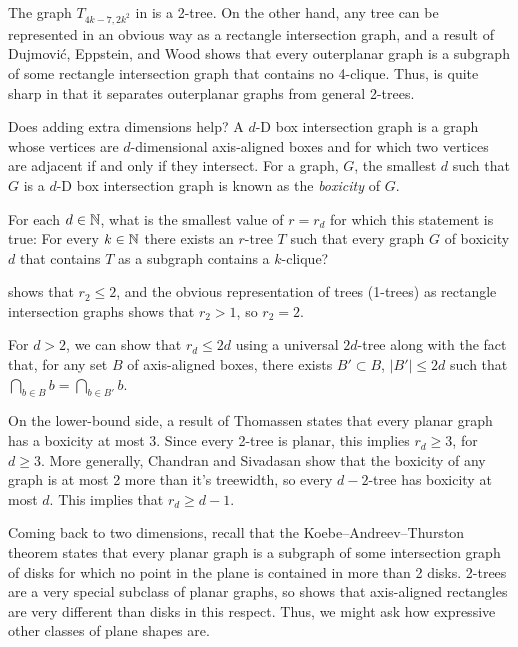 \documentclass[lotsofwhite]{patmorin}
\begin{document}
The graph $T_{4k-7,2k^2}$ in  is a 2-tree.
On the other hand, any tree can be represented in an obvious way as a
rectangle intersection graph, and a result of Dujmovi\'c, Eppstein, and
Wood \cite[Theorem~X]{X} shows that every outerplanar graph is a subgraph
of some rectangle intersection graph that contains no 4-clique.  Thus,
 is quite sharp in that it separates outerplanar
graphs from general 2-trees.

Does adding extra dimensions help?  A $d$-D box intersection graph is a
graph whose vertices are $d$-dimensional axis-aligned boxes and for which
two vertices are adjacent if and only if they intersect.  For a graph,
$G$, the smallest $d$ such that $G$ is a $d$-D box intersection graph
is known as the \emph{boxicity} of $G$.

\begin{op}
   For each $d\in\mathbb{N}$, what is the smallest value of $r=r_d$ for which
   this statement is true: For every $k\in\mathbb{N}$ there exists an $r$-tree
   $T$ such that every graph $G$ of boxicity $d$ that contains $T$
   as a subgraph contains a $k$-clique?
\end{op}

 shows that $r_2 \le 2$, and the obvious
representation of trees (1-trees) as rectangle intersection graphs shows
that $r_2> 1$, so $r_2=2$.

For $d>2$, we can show that $r_d \le 2d$ using a universal $2d$-tree along
with the fact that, for any set $B$ of axis-aligned boxes, there exists
$B'\subset B$, $|B'|\le 2d$ such that $\bigcap_{b\in B}b=\bigcap_{b\in
B'}b$.  

On the lower-bound side, a result of Thomassen \cite{thomassen:interval}
states that every planar graph has a boxicity at most 3. Since every
2-tree is planar, this implies $r_d \ge 3$, for $d\ge 3$.  More generally,
Chandran and Sivadasan \cite{chandran.sivadasan:boxicity} show that
the boxicity of any graph is at most 2 more than it's treewidth, so
every $d-2$-tree has boxicity at most $d$. This implies that $r_d\ge d-1$.

Coming back to two dimensions, recall that the Koebe–Andreev–Thurston
theorem states that every planar graph is a subgraph of some intersection
graph of disks for which no point in the plane is contained in more
than 2 disks.  2-trees are a very special subclass of planar graphs,
so  shows that axis-aligned rectangles are very
different than disks in this respect. Thus, we might ask how expressive
other classes of plane shapes are.
\end{document}
